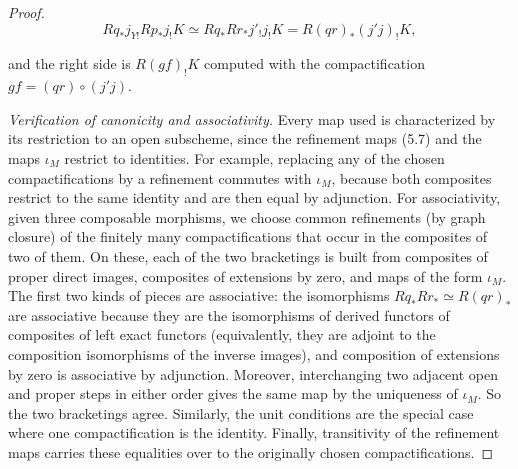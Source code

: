 \documentclass[11pt]{article}
\begin{document}
\begin{proof}[{Proof}]
\[
Rq_*j_{Y!}Rp_*j_!K\simeq Rq_*Rr_*j'_!j_!K=R(qr)_*(j'j)_!K,
\]

and the right side is \(R(gf)_!K\) computed with the compactification \(gf=(qr)\circ(j'j)\).

\emph{Verification of canonicity and associativity.} Every map used is characterized by its restriction to an open subscheme, since the refinement maps (5.7) and the maps \(\iota_M\) restrict to identities. For example, replacing any of the chosen compactifications by a refinement commutes with \(\iota_M\), because both composites restrict to the same identity and are then equal by adjunction. For associativity, given three composable morphisms, we choose common refinements (by graph closure) of the finitely many compactifications that occur in the composites of two of them. On these, each of the two bracketings is built from composites of proper direct images, composites of extensions by zero, and maps of the form \(\iota_M\). The first two kinds of pieces are associative: the isomorphisms \(Rq_*Rr_*\simeq R(qr)_*\) are associative because they are the isomorphisms of derived functors of composites of left exact functors (equivalently, they are adjoint to the composition isomorphisms of the inverse images), and composition of extensions by zero is associative by adjunction. Moreover, interchanging two adjacent open and proper steps in either order gives the same map by the uniqueness of \(\iota_M\). So the two bracketings agree. Similarly, the unit conditions are the special case where one compactification is the identity. Finally, transitivity of the refinement maps carries these equalities over to the originally chosen compactifications.


\end{proof}
\end{document}
